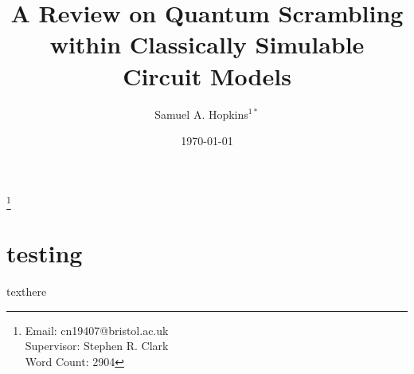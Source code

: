\documentclass[aps, nobalancelastpage]{revtex4-2}
\begin{document}
\title{A Review on Quantum Scrambling within Classically Simulable Circuit Models}

\author{Samuel A. Hopkins$^{1*}$}
\date{\today}
\thanks{Email: cn19407@bristol.ac.uk\\
Supervisor: Stephen R. Clark\\
Word Count: 2904
}



% 
\maketitle
\clearpage
\tableofcontents







\appendix
\section{testing}
texthere



\end{document}
